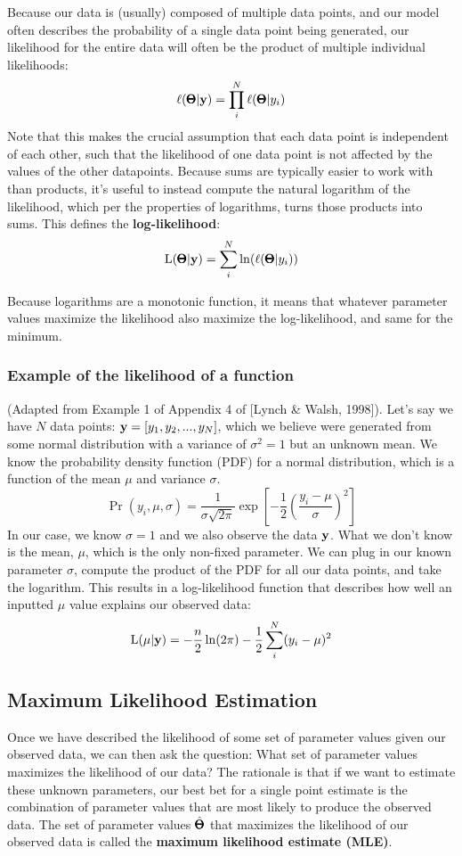 \documentclass[12pt]{article}
\begin{document}
Because our data is (usually) composed of multiple data points, and our model often describes the probability of a single data point being generated, our likelihood for the entire data will often be the product of multiple individual likelihoods:
$$ \ell(\pmb{\Theta} | \mathbf{y}) = \prod_i^{N} \ell(\pmb{\Theta} | y_i) $$
Note that this makes the crucial assumption that each data point is independent of each other, such that the likelihood of one data point is not affected by the values of the other datapoints.
Because sums are typically easier to work with than products, it's useful to instead compute the natural logarithm of the likelihood, which per the properties of logarithms, turns those products into sums.
This defines the \textbf{log-likelihood}:
$$ \mathrm{L}(\pmb{\Theta} | \mathbf{y}) = \sum_i^{N} \ln( \ell(\pmb{\Theta} | y_i) ) $$

Because logarithms are a monotonic function, it means that whatever parameter values maximize the likelihood also maximize the log-likelihood, and same for the minimum.

\subsubsection{Example of the likelihood of a function}
(Adapted from Example 1 of Appendix 4 of [Lynch \& Walsh, 1998]).
Let's say we have $N$ data points: $\mathbf{y} = [y_1,y_2, ..., y_N]$, which we believe were generated from some normal distribution with a variance of $\sigma^2 = 1$ but an unknown mean.
We know the probability density function (PDF) for a normal distribution, which is a function of the mean $\mu$ and variance $\sigma$.
$$
\Pr(y_i, \mu, \sigma) = 
\frac{1}{\sigma \sqrt{2 \pi}}
\exp[- \frac{1}{2} (
    \frac{y_i - \mu}{\sigma}
    )^2]
$$
In our case, we know $\sigma = 1$ and we also observe the data $\mathbf{y}$.
What we don't know is the mean, $\mu$, which is the only non-fixed parameter.
We can plug in our known parameter $\sigma$, compute the product of the PDF for all our data points, and take the logarithm.
This results in a log-likelihood function that describes how well an inputted $\mu$ value explains our observed data:
$$
\mathrm{L}(\mu | \mathbf{y}) = - \frac{n}{2} \ln(2 \pi) -
\frac{1}{2} \sum_i^{N} (y_i - \mu)^2
$$

\subsection{Maximum Likelihood Estimation}
Once we have described the likelihood of some set of parameter values given our observed data, we can then ask the question:
What set of parameter values maximizes the likelihood of our data?
The rationale is that if we want to estimate these unknown parameters, our best bet for a single point estimate is the combination of parameter values that are most likely to produce the observed data.
The set of parameter values $\hat{\pmb{\Theta}}$ that maximizes the likelihood of our observed data is called the \textbf{maximum likelihood estimate (MLE)}.
\end{document}
